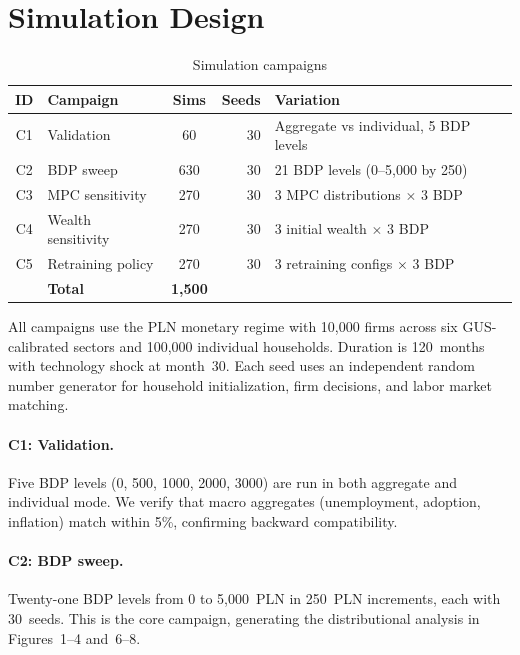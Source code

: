 \documentclass[12pt,a4paper]{article}
\begin{document}
\section{Simulation Design}
\label{sec:simulations}

\begin{table}[htbp]
\centering
\caption{Simulation campaigns}
\label{tab:campaigns}
\begin{tabular}{clcrl}
\toprule
\textbf{ID} & \textbf{Campaign} & \textbf{Sims} & \textbf{Seeds} & \textbf{Variation} \\
\midrule
C1 & Validation & 60 & 30 & Aggregate vs individual, 5 BDP levels \\
C2 & BDP sweep & 630 & 30 & 21 BDP levels (0--5,000 by 250) \\
C3 & MPC sensitivity & 270 & 30 & 3 MPC distributions $\times$ 3 BDP \\
C4 & Wealth sensitivity & 270 & 30 & 3 initial wealth $\times$ 3 BDP \\
C5 & Retraining policy & 270 & 30 & 3 retraining configs $\times$ 3 BDP \\
\midrule
   & \textbf{Total} & \textbf{1,500} & & \\
\bottomrule
\end{tabular}
\end{table}

All campaigns use the PLN monetary regime with 10,000 firms across six
GUS-calibrated sectors and 100,000 individual households. Duration is
120~months with technology shock at month~30. Each seed uses an
independent random number generator for household initialization, firm
decisions, and labor market matching.

\paragraph{C1: Validation.} Five BDP levels (0, 500, 1000, 2000, 3000)
are run in both aggregate and individual mode. We verify that macro
aggregates (unemployment, adoption, inflation) match within 5\%,
confirming backward compatibility.

\paragraph{C2: BDP sweep.} Twenty-one BDP levels from 0 to 5,000~PLN in
250~PLN increments, each with 30~seeds. This is the core campaign,
generating the distributional analysis in Figures~1--4 and~6--8.
\end{document}
